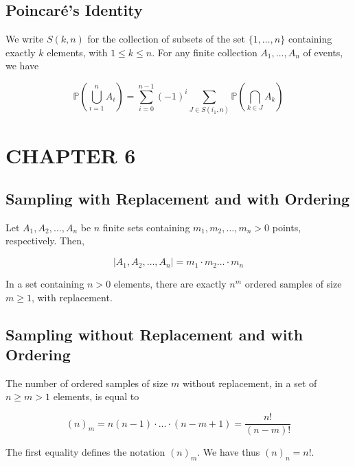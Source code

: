 \documentclass[12pt]{article}
\newcommand{\prob}[1]{\mathbb{P}(#1)}
\begin{document}
\subsection*{Poincar\'{e}'s Identity}
\noindent
We write $S(k,n)$ for the collection of subsets of the set $\{ 1, \ldots, n \}$ containing exactly $k$ elements, with $1 \leq k \leq n$. For any finite collection $A_1, \ldots, A_n$ of events, we have

\begin{equation*}
\prob{\bigcup_{i=1}^{n} A_i} = \sum_{i=0}^{n-1} (-1)^i \sum_{J \in S(i_1, n)} \prob{\bigcap_{k \in J} A_k}
\end{equation*}

\section*{CHAPTER 6}
\subsection*{Sampling with Replacement and with Ordering}
\noindent
Let $A_1, A_2, \ldots, A_n$ be $n$ finite sets containing $m_1, m_2, \ldots, m_n > 0$ points, respectively. Then, 

\begin{equation}
\lvert A_1, A_2, \ldots, A_n \rvert = m_1 \cdot m_2 \ldots \cdot m_n
\end{equation}

\noindent
In a set containing $n > 0$ elements, there are exactly $n^m$ ordered samples of size $m \geq 1$, with replacement.

\subsection*{Sampling without Replacement and with Ordering}
The number of ordered samples of size $m$ without replacement, in a set of $n \geq m > 1$ elements, is equal to 

\begin{equation*}
(n)_m = n(n-1) \cdot \ldots \cdot (n-m+1) = \frac{n!}{(n-m)!}
\end{equation*}

\noindent
The first equality defines the notation $(n)_m$. We have thus $(n)_n = n!$.
\end{document}
